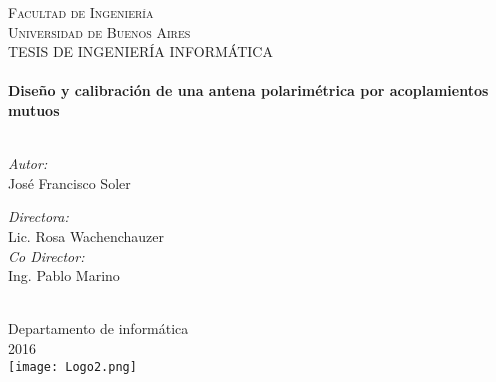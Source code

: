 \documentclass[11pt, oneside]{Thesis} %
\begin{document}
\begin{titlepage}
\begin{center}

\textsc{\LARGE Facultad de Ingeniería \\ Universidad de Buenos Aires}\\[1.5cm] %
\textsc{\Large TESIS DE INGENIERÍA INFORMÁTICA}\\[0.5cm] %

\HRule \\[0.4cm] %
{\huge \bfseries Diseño y calibración de una antena polarimétrica por acoplamientos mutuos}\\[0.4cm] %
\HRule \\[1.5cm] %

\begin{minipage}{0.4\textwidth}
\begin{flushleft} \large
\emph{Autor:}\\
{José Francisco Soler} %
\end{flushleft}
\end{minipage}
\begin{minipage}{0.4\textwidth}
\begin{flushright} \large
\emph{Directora:} \\
{Lic. Rosa Wachenchauzer} \\
\emph{Co Director:} \\
{Ing. Pablo Marino} %
\end{flushright}
\end{minipage}\\[3cm]

Departamento de informática\\
2016\\[2cm] %

\texttt{[image: Logo2.png]} %

\vfill
\end{center}

\end{titlepage}
\end{document}
